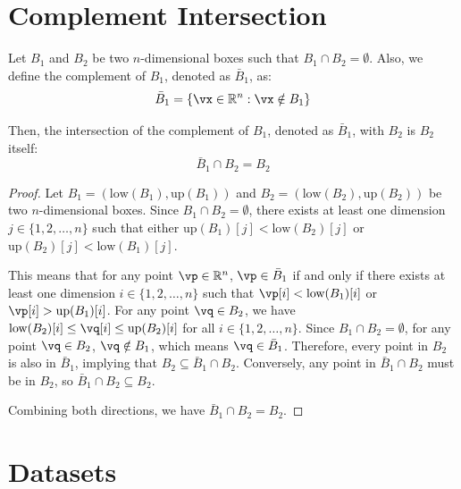 \documentclass[runningheads]{llncs}
\newcommand{\lowc}[1]{\mbox{low}({#1})}
\newcommand{\upc}[1]{\mbox{up}({#1})}
\begin{document}
\clearpage

\appendix

\section{Complement Intersection}
\label{app:complement_intersection}
\begin{lemma}

Let $B_1$ and $B_2$ be two $n$-dimensional boxes such that
$B_1 \cap B_2 = \emptyset$. Also, we define the complement of $B_1$, denoted
as $\bar{B}_1$, as:
\begin{equation*}
  \bar{B}_1 = \{\vx \in \mathbb{R}^n : \vx \notin B_1\}
\end{equation*}


Then, the intersection of the complement
of $B_1$, denoted as $\bar{B}_1$, with $B_2$ is $B_2$ itself:
\begin{equation*}
\bar{B}_1 \cap B_2 = B_2
\end{equation*}
\end{lemma}

\begin{proof}
  Let $B_1 = (\lowc{B_1}, \upc{B_1})$ and
  $B_2 = (\lowc{B_2}, \upc{B_2})$ be two $n$-dimensional boxes. Since
  $B_1 \cap B_2 = \emptyset$, there exists at least one dimension
  $j \in \{1, 2, \ldots, n\}$ such that either
  $\upc{B_1}[j] < \lowc{B_2}[j]$ or $\upc{B_2}[j] < \lowc{B_1}[j]$.

  This means that for any point $\vp \in \mathbb{R}^n$,
  $\vp \in \bar{B}_1$ if and only if there exists at least one
  dimension $i \in \{1, 2, \ldots, n\}$ such that
  $\vp[i] < \lowc{B_1}[i]$ or $\vp[i] > \upc{B_1}[i]$. For any point
  $\vq \in B_2$, we have $\lowc{B_2}[i] \leq \vq[i] \leq \upc{B_2}[i]$
  for all $i \in \{1, 2, \ldots, n\}$. Since
  $B_1 \cap B_2 = \emptyset$, for any point $\vq \in B_2$,
  $\vq \notin B_1$, which means $\vq \in \bar{B}_1$. Therefore, every
  point in $B_2$ is also in $\bar{B}_1$, implying that
  $B_2 \subseteq \bar{B}_1 \cap B_2$. Conversely, any point in
  $\bar{B}_1 \cap B_2$ must be in $B_2$, so
  $\bar{B}_1 \cap B_2 \subseteq B_2$.

  Combining both directions, we have $\bar{B}_1 \cap B_2 = B_2$.
\end{proof}





\section{Datasets}
\label{app:datasets}
\end{document}
